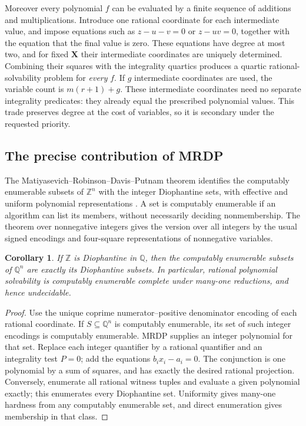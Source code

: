 \documentclass[11pt]{article}
\newtheorem{corollary}[theorem]{Corollary}
\theoremstyle{definition}
\newcommand{\Q}{\mathbb Q}
\newcommand{\Z}{\mathbb Z}
\begin{document}
Moreover every polynomial $f$ can be evaluated by a finite sequence
of additions and multiplications. Introduce one rational coordinate
for each intermediate value, and impose equations such as
$z-u-v=0$ or $z-uv=0$, together with the equation that the final value
is zero. These equations have degree at most two, and for fixed
$\mathbf X$ their intermediate coordinates are uniquely determined.
Combining their squares with the integrality quartics produces a
quartic rational-solvability problem for \emph{every} $f$. If $g$
intermediate coordinates are used, the variable count is
$m(r+1)+g$. These intermediate coordinates need no separate
integrality predicates: they already equal the prescribed polynomial
values. This trade preserves degree at the cost of variables, so it
is secondary under the requested priority.

\subsection{The precise contribution of MRDP}

The Matiyasevich--Robinson--Davis--Putnam theorem identifies the
computably enumerable subsets of $\Z^n$ with the integer Diophantine
sets, with effective and uniform polynomial representations
\cite{Matiyasevich1970,Jones1982}. A set is computably enumerable if
an algorithm can list its members, without necessarily deciding
nonmembership. The theorem over nonnegative integers gives the version
over all integers by the usual signed encodings and four-square
representations of nonnegative variables.

\begin{corollary}\label{cor:rational-mrdp}
If $\Z$ is Diophantine in $\Q$, then the computably enumerable
subsets of $\Q^n$ are exactly its Diophantine subsets. In particular,
rational polynomial solvability is computably enumerable complete
under many-one reductions, and hence undecidable.
\end{corollary}
\begin{proof}
Use the unique coprime numerator--positive denominator encoding of
each rational coordinate. If $S\subseteq\Q^n$ is computably
enumerable, its set of such integer encodings is computably enumerable.
MRDP supplies an integer polynomial for that set. Replace each integer
quantifier by a rational quantifier and an integrality test $P=0$;
add the equations $b_i x_i-a_i=0$. The conjunction is one polynomial
by a sum of squares, and has exactly the desired rational projection.
Conversely, enumerate all rational witness tuples and evaluate a given
polynomial exactly; this enumerates every Diophantine set.
Uniformity gives many-one hardness from any computably enumerable
set, and direct enumeration gives membership in that class.
\end{proof}
\end{document}
